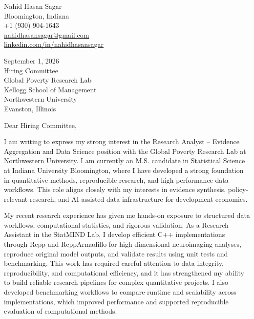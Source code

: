 \documentclass[11pt,letterpaper]{article}
\begin{document}
\begin{flushleft}
Nahid Hasan Sagar\\
Bloomington, Indiana\\
+1 (930) 904-1643\\
\href{mailto:nahidhasansagar@gmail.com}{nahidhasansagar@gmail.com}\\
\href{https://www.linkedin.com/in/nahidhasansagar/}{linkedin.com/in/nahidhasansagar}
\end{flushleft}

\vspace{0.2em}

September 1, 2026\\[0.2em]

Hiring Committee\\
Global Poverty Research Lab\\
Kellogg School of Management\\
Northwestern University\\
Evanston, Illinois

\vspace{1em}

Dear Hiring Committee,

I am writing to express my strong interest in the Research Analyst -- Evidence Aggregation and Data Science position with the Global Poverty Research Lab at Northwestern University. I am currently an M.S. candidate in Statistical Science at Indiana University Bloomington, where I have developed a strong foundation in quantitative methods, reproducible research, and high-performance data workflows. This role aligns closely with my interests in evidence synthesis, policy-relevant research, and AI-assisted data infrastructure for development economics.

My recent research experience has given me hands-on exposure to structured data workflows, computational statistics, and rigorous validation. As a Research Assistant in the StatMIND Lab, I develop efficient C++ implementations through Rcpp and RcppArmadillo for high-dimensional neuroimaging analyses, reproduce original model outputs, and validate results using unit tests and benchmarking. This work has required careful attention to data integrity, reproducibility, and computational efficiency, and it has strengthened my ability to build reliable research pipelines for complex quantitative projects. I also developed benchmarking workflows to compare runtime and scalability across implementations, which improved performance and supported reproducible evaluation of computational methods.
\end{document}
